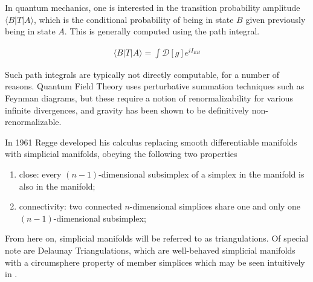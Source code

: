 \documentclass[12pt]{article}
\begin{document}
In quantum mechanics, one is interested in the transition probability amplitude $\langle B|T|A\rangle$, which is the conditional probability of being in state $B$ given previously being in state $A$. This is generally computed using the path integral.

\begin{align}
  \langle B|T|A\rangle=\int\mathcal{D}[g]e^{iI_{EH}}
\end{align}

Such path integrals are typically not directly computable, for a number of reasons. Quantum Field Theory uses perturbative summation techniques such as Feynman diagrams, but these require a notion of renormalizability for various infinite divergences, and gravity has been shown to be definitively non-renormalizable.\cite{shomer_pedagogical_2007}

In 1961 Regge developed his calculus replacing smooth differentiable manifolds with simplicial manifolds, obeying the following two properties\\[-4ex]
\begin{enumerate}\addtolength{\itemsep}{-1.5ex}
\item close: every $(n-1)$-dimensional subsimplex of a simplex in the manifold is also in the manifold;  
\item connectivity: two connected $n$-dimensional simplices share one and only one $(n-1)$-dimensional subsimplex;
\end{enumerate}
\vspace*{-1ex}

From here on, simplicial manifolds will be referred to as triangulations. Of special note are Delaunay Triangulations, which are well-behaved simplicial manifolds
with a circumsphere property of member simplices which may be seen intuitively in .
\end{document}
